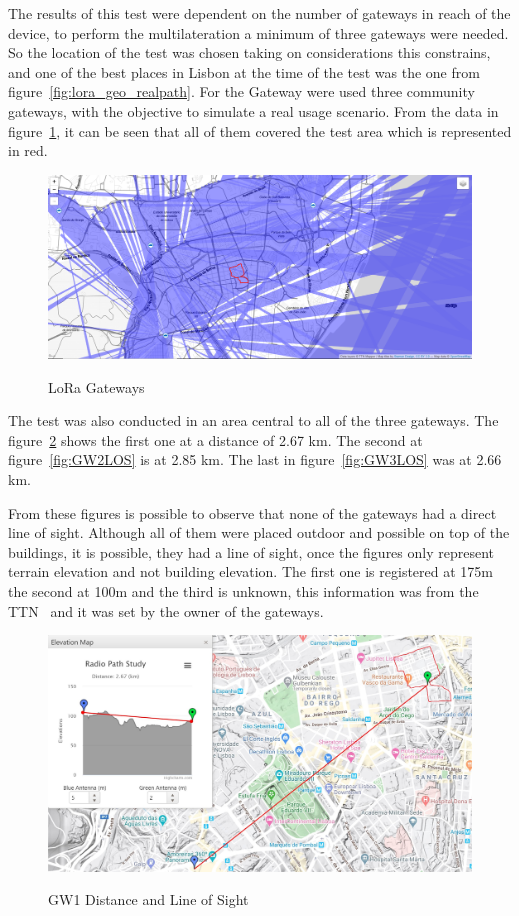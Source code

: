 The results of this test were dependent on the number of gateways in reach of the device, to perform the multilateration a minimum of three gateways were needed. So the location of the test was chosen taking on considerations this constrains, and one of the best places in Lisbon at the time of the test was the one from figure~\ref{fig:lora_geo_realpath}. For the Gateway were used three community gateways, with the objective to simulate a real usage scenario. From the data in figure~\ref{fig:lora_geo_GWs}, it can be seen that all of them covered the test area which is represented in red. 

\begin{figure}[htbp]
  \centering
  
    {\includegraphics[width=0.8\linewidth]{Chapters/Figures/lorageoresttnmapperGWS.png}}%
 
  \caption{LoRa Gateways}
  \label{fig:lora_geo_GWs}
\end{figure}

The test was also conducted in an area central to all of the three gateways. The figure~\ref{fig:GW1LOS} shows the first one at a distance of 2.67 km. The second at figure~\ref{fig:GW2LOS} is at 2.85 km. The last in figure~\ref{fig:GW3LOS} was at 2.66 km. 

From these figures is possible to observe that none of the gateways had a direct line of sight. Although all of them were placed outdoor and possible on top of the buildings, it is possible, they had a line of sight, once the figures only represent terrain elevation and not building elevation. The first one is registered at 175m the second at 100m and the third is unknown, this information was from the TTN~\cite{TTN} and it was set by the owner of the gateways.

\begin{figure}[htbp]
  \centering
       {\includegraphics[width=0.7\linewidth]{Chapters/Figures/GW1.JPG}}%
   \caption{GW1 Distance and Line of Sight}
  \label{fig:GW1LOS}
\end{figure}

